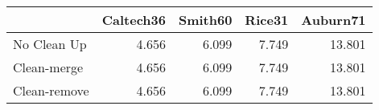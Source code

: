 \begin{tabular}{lrrrr}
\toprule
{} & Caltech36 & Smith60 & Rice31 & Auburn71 \\
\midrule
No Clean Up  &     4.656 &   6.099 &  7.749 &   13.801 \\
Clean-merge  &     4.656 &   6.099 &  7.749 &   13.801 \\
Clean-remove &     4.656 &   6.099 &  7.749 &   13.801 \\
\bottomrule
\end{tabular}
